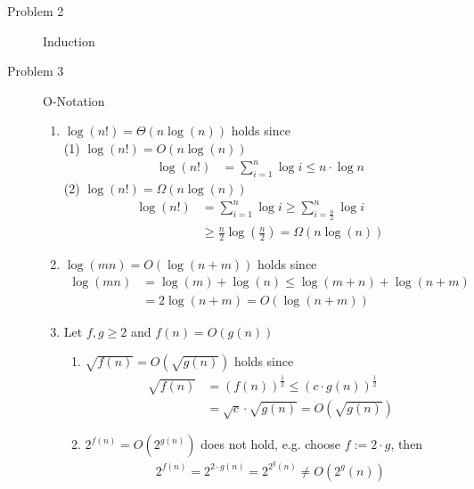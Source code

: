 \documentclass[11pt,a4paper,ngerman]{article}
\begin{document}
\begin{description}
\item[Problem 2] Induction \\


\item[Problem 3] O-Notation
  \begin{enumerate}
    \item $\log(n!) = \Theta(n \log(n))$ holds since\\
          (1) $\log(n!) = O(n \log(n))$ \\
              \begin{equation}\begin{split}
                \log(n!) &= \sum_{i=1}^n {\log i} 
                         \leq n \cdot \log n
              \end{split}\end{equation}
          (2) $\log(n!) = \Omega(n \log(n))$ \\
              \begin{equation}\begin{split}
                \log(n!) &= \sum_{i=1}^n {\log i} \geq \sum_{i=\frac{n}{2}}^n {\log i} \\
                         &\geq \frac{n}{2} \log(\frac{n}{2}) = \Omega(n \log(n))
              \end{split}\end{equation}
    \item $\log(mn) = O(\log(n+m))$ holds since
      \begin{equation}\begin{split}
        \log(mn) &= \log(m) + \log(n) \leq \log(m+n) + \log(n+m)\\
                 &= 2 \log(n+m) = O(\log(n+m))
      \end{split}\end{equation}
  
    \item Let $f,g \geq 2$ and $f(n) = O(g(n))$
    \begin{enumerate}
      \item $\sqrt{f(n)} = O(\sqrt{g(n)})$ holds since
            \begin{equation}\begin{split}
              \sqrt{f(n)} &= (f(n))^{\frac{1}{2}} \leq (c\cdot g(n))^{\frac{1}{2}}\\
                          &= \sqrt{c}\cdot \sqrt{g(n)} = O(\sqrt{g(n)})
            \end{split}\end{equation}
      \item $2^{f(n)} = O(2^{g(n)})$ does not hold, e.g. choose $f := 2\cdot g$, then
            \begin{equation}\begin{split}
              2^{f(n)} = 2^{2\cdot g(n)} = 2^{2^g(n)} \neq O(2^g(n))
            \end{split}\end{equation}
    \end{enumerate}
  \end{enumerate}

\end{description}

\label{LastPage}
\end{document}
